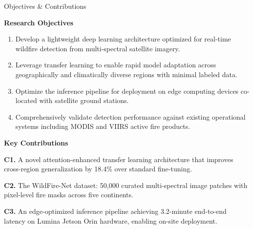 \documentclass[10pt]{article}
\newlength{\panelwidth}
\newcommand{\paneltitle}[1]{%
  \begin{panelhead}%
    #1%
  \end{panelhead}%
}
\newcommand{\subheading}[1]{%
  \medskip
  {\color{secondary}\bfseries\small #1}
  \smallskip
}
\newcommand{\smallsep}{\vspace{6pt}}
\begin{document}
\hfill
\begin{minipage}[t]{\panelwidth}
  \RaggedRight

  \paneltitle{\faCrosshairs\hspace{4pt}Objectives \& Contributions}

  \smallsep

  \subheading{Research Objectives}

  {\footnotesize\color{darktext}
  \begin{enumerate}[label={\color{primary}\bfseries O\arabic*},leftmargin=16pt]
    \item Develop a lightweight deep learning architecture
          optimized for real-time wildfire detection from
          multi-spectral satellite imagery.
    \item Leverage transfer learning to enable rapid model
          adaptation across geographically and climatically
          diverse regions with minimal labeled data.
    \item Optimize the inference pipeline for deployment on
          edge computing devices co-located with satellite
          ground stations.
    \item Comprehensively validate detection performance
          against existing operational systems including MODIS
          and VIIRS active fire products.
  \end{enumerate}
  }

  \smallsep

  \subheading{Key Contributions}

  \begin{accentstrip}
    {\footnotesize\bfseries\color{accent!80!black}C1.}
    {\footnotesize\color{darktext} A novel attention-enhanced
    transfer learning architecture that improves cross-region
    generalization by 18.4\% over standard fine-tuning.}
  \end{accentstrip}

  \begin{accentstrip}
    {\footnotesize\bfseries\color{accent!80!black}C2.}
    {\footnotesize\color{darktext} The WildFire-Net dataset:
    50,000 curated multi-spectral image patches with
    pixel-level fire masks across five continents.}
  \end{accentstrip}

  \begin{accentstrip}
    {\footnotesize\bfseries\color{accent!80!black}C3.}
    {\footnotesize\color{darktext} An edge-optimized inference
    pipeline achieving 3.2-minute end-to-end latency on
    Lumina Jetson Orin hardware, enabling on-site deployment.}
  \end{accentstrip}


\end{minipage}
\end{document}

